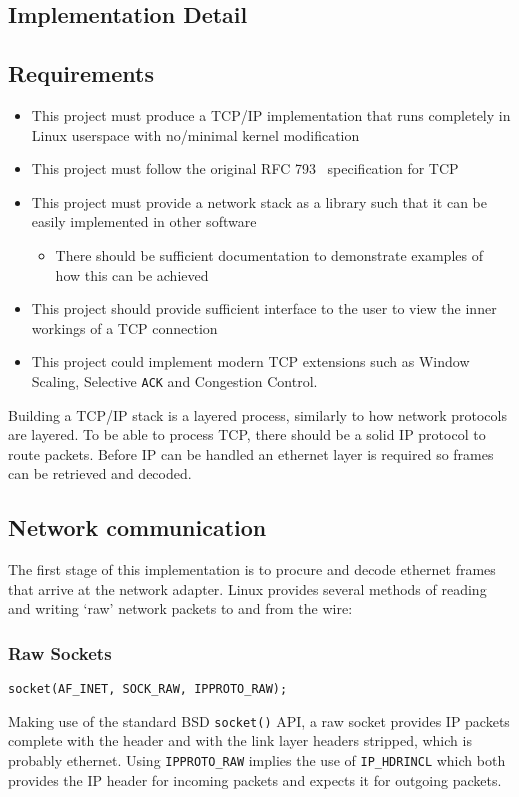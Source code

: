 \documentclass[11pt,a4paper,british]{bhamarticle}
\begin{document}
\begin{multicols}{2}
\section{Implementation Detail}


\subsection{Requirements}
\begin{itemize}
    \item This project must produce a TCP/IP implementation that runs completely in Linux userspace with no/minimal kernel modification
    \item This project must follow the original RFC 793~\cite{rfc793} specification for TCP
    \item This project must provide a network stack as a library such that it can be easily implemented in other software
        \begin{itemize}
            \item There should be sufficient documentation to demonstrate examples of how this can be achieved
        \end{itemize}
    \item This project should provide sufficient interface to the user to view the inner workings of a TCP connection
    \item This project could implement modern TCP extensions such as Window Scaling, Selective \texttt{ACK} and Congestion Control.
\end{itemize}

Building a TCP/IP stack is a layered process, similarly to how network protocols are layered. To be able to process TCP, there should be a solid IP protocol to route packets. Before IP can be handled an ethernet layer is required so frames can be retrieved and decoded.

\subsection{Network communication}
The first stage of this implementation is to procure and decode ethernet frames that arrive at the network adapter. Linux provides several methods of reading and writing `raw' network packets to and from the wire:
\subsubsection{Raw Sockets}
\begin{Verbatim}[fontsize=\small]
socket(AF_INET, SOCK_RAW, IPPROTO_RAW);
\end{Verbatim}
Making use of the standard BSD \texttt{socket()} API, a raw socket provides IP packets complete with the header and with the link layer headers stripped, which is probably ethernet. Using \texttt{IPPROTO\_RAW} implies the use of \texttt{IP\_HDRINCL} which both provides the IP header for incoming packets and expects it for outgoing packets.


\end{multicols}
\end{document}
